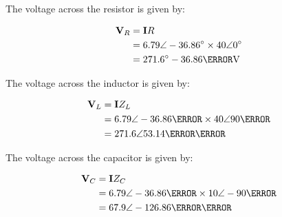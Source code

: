 \documentclass[paper=a4, fontsize=11pt]{scrartcl} %
\numberwithin{equation}{section} %
\numberwithin{figure}{section} %
\numberwithin{table}{section} %
\begin{document}
The voltage across the resistor is given by:

\begin{align*}
\textbf{V}_{R} &= \textbf{I}R \\
&= 6.79 \angle -36.86\si{\degree} \times 40 \angle 0\si{\degree}\\
&= 271.6 \si{\degree} -36.86\degree \si{\volt}
\end{align*}

\newpage

The voltage across the inductor is given by:

\begin{align*}
\textbf{V}_{L} &= \textbf{I}Z_{L} \\
&= 6.79 \angle -36.86\degree \times 40 \angle 90\degree \\
&= 271.6 \angle 53.14\degree \volt
\end{align*}

The voltage across the capacitor is given by:

\begin{align*}
\textbf{V}_{C} &= \textbf{I}Z_{C} \\
&= 6.79 \angle -36.86\degree \times 10 \angle -90\degree \\
&= 67.9 \angle -126.86\degree \volt
\end{align*}
\end{document}
